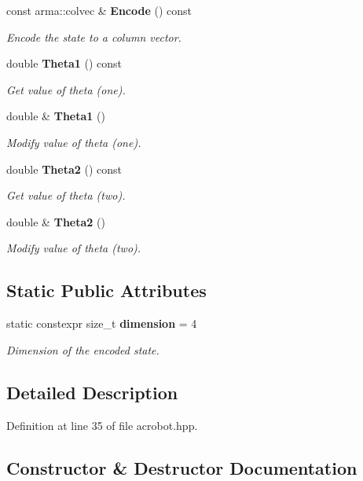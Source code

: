 \begin{DoxyCompactItemize}
const arma\+::colvec \& \textbf{ Encode} () const
\begin{DoxyCompactList}\small\item\em Encode the state to a column vector. \end{DoxyCompactList}\item 
double \textbf{ Theta1} () const
\begin{DoxyCompactList}\small\item\em Get value of theta (one). \end{DoxyCompactList}\item 
double \& \textbf{ Theta1} ()
\begin{DoxyCompactList}\small\item\em Modify value of theta (one). \end{DoxyCompactList}\item 
double \textbf{ Theta2} () const
\begin{DoxyCompactList}\small\item\em Get value of theta (two). \end{DoxyCompactList}\item 
double \& \textbf{ Theta2} ()
\begin{DoxyCompactList}\small\item\em Modify value of theta (two). \end{DoxyCompactList}\end{DoxyCompactItemize}
\subsection*{Static Public Attributes}
\begin{DoxyCompactItemize}
\item 
static constexpr size\+\_\+t \textbf{ dimension} = 4
\begin{DoxyCompactList}\small\item\em Dimension of the encoded state. \end{DoxyCompactList}\end{DoxyCompactItemize}


\subsection{Detailed Description}


Definition at line 35 of file acrobot.\+hpp.



\subsection{Constructor \& Destructor Documentation}
\mbox{\label{classmlpack_1_1rl_1_1Acrobot_1_1State_a790355057d12e9c1ce7643551c16fecd}} 
